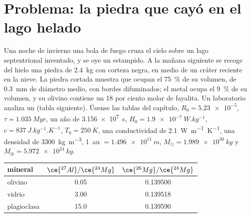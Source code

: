 \section{Problema: la piedra que cayó en el lago helado}

\begin{problem}
\label{pb:b2:planet-formation-meteorites:1}
Una noche de invierno una bola de fuego cruza el cielo sobre un lago septentrional inventado,
y se oye un estampido. A la mañana siguiente se recoge del hielo una piedra de \qty{2.4}{kg} con
corteza negra, en medio de un cráter reciente en la nieve. La piedra
cortada muestra  que ocupan el \qty{75}{\percent} de su volumen, de \qty{0.3}{mm}
de diámetro medio, con bordes difuminados; el metal ocupa el \qty{9}{\percent} de su
volumen, y su olivino contiene un 18 por ciento molar de fayalita. Un laboratorio
analiza un  (tabla siguiente). Úsense las tablas del capítulo,
$R_0 = \num{5.23e-5}$, $\tau = \qty{1.035}{Myr}$, un año de \qty{3.156e7}{s},
$H_0 = \qty{1.9e-7}{W.kg^{-1}}$, $c = \qty{837}{J.kg^{-1}.K^{-1}}$,
$T_0 = \qty{250}{K}$, una conductividad de \qty{2.1}{W.m^{-1}.K^{-1}}, una densidad de
\qty{3300}{kg.m^{-3}}, \qty{1}{au} $= \qty{1.496e11}{m}$,
$M_\odot = \qty{1.989e30}{kg}$ y $M_\oplus = \qty{5.972e24}{kg}$.

\begin{center}
\small
\begin{tabular}{lcc}
\hline
mineral & $\ce{^{27}Al}/\ce{^{24}Mg}$ & $\ce{^{26}Mg}/\ce{^{24}Mg}$\\
\hline
olivino & 0.05 & \num{0.139500}\\
vidrio & 3.00 & \num{0.139518}\\
plagioclasa & 15.0 & \num{0.139590}\\
\hline
\end{tabular}
\end{center}


\end{problem}
